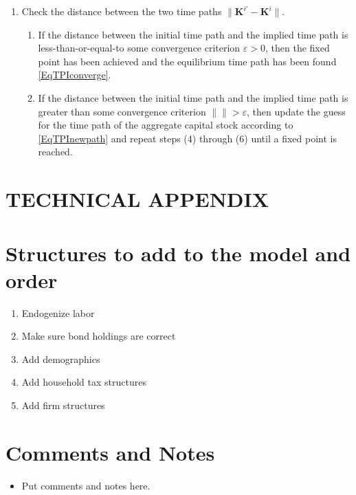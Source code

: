 \documentclass[letterpaper,12pt]{article}
\theoremstyle{definition}
\newcommand\ve{\varepsilon}
\providecommand{\norm}[1]{\lVert#1\rVert}
\begin{document}
\begin{enumerate}
\begin{enumerate}
      \end{enumerate}
    \item Check the distance between the two time paths $\norm{\bm{K}^{i'}-\bm{K}^i}$.
      \begin{enumerate}
        \item If the distance between the initial time path and the implied time path is less-than-or-equal-to some convergence criterion $\ve>0$, then the fixed point has been achieved and the equilibrium time path has been found \eqref{EqTPIconverge}.
        \item If the distance between the initial time path and the implied time path is greater than some convergence criterion $\norm{}>\ve$, then update the guess for the time path of the aggregate capital stock according to \eqref{EqTPInewpath} and repeat steps (4) through (6) until a fixed point is reached.
      \end{enumerate}
  \end{enumerate}

  \clearpage


\newpage




\newpage
\renewcommand{\theequation}{T.\arabic{section}.\arabic{equation}}
\renewcommand{\thesection}{T-\arabic{section}}   %
\setcounter{equation}{0}                         %
\setcounter{section}{0}                          %
\section*{TECHNICAL APPENDIX}


\section{Structures to add to the model and order}\label{TAppSteps}

  \begin{enumerate}
    \item Endogenize labor
    \item Make sure bond holdings are correct
    \item Add demographics
    \item Add household tax structures
    \item Add firm structures
  \end{enumerate}


\newpage
\section{Comments and Notes}\label{TAppComments}

  \begin{itemize}
    \item Put comments and notes here.
  \end{itemize}
\end{document}
